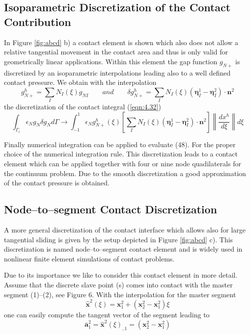 \subsection{Isoparametric Discretization of the Contact Contribution}
In Figure \ref{fig:abcd} b) a contact element is shown which also does not allow a relative tangential
movement in the contact area and thus is only valid for geometrically linear applications.
Within this element the gap function $g_{N+}$ is discretized by an isoparametric interpolations
leading also to a well deﬁned contact pressure. We obtain with the interpolation
\begin{equation}
     g_{N+}^{h}=\sum_{I} N_{I}(\xi) g_{N I} \qquad  \textit{and}  \qquad \delta g_{N+}^{h}=\sum_{I} N_{I}(\xi)\left(\boldsymbol{\eta}_{I}^{1}-\boldsymbol{\eta}_{I}^{2}\right) \cdot \mathbf{n}^{2} 
\end{equation}
the discretization of the contact integral (\ref{eqn:4.32})
\begin{equation}
 \int_{\Gamma_{c}} \epsilon_{N} g_{N} \delta g_{N} d \Gamma \longrightarrow \int_{-1}^{1} \epsilon_{N} g_{N+}^{h}(\xi)\left[\sum_{I} N_{I}(\xi)\left(\boldsymbol{\eta}_{I}^{1}-\boldsymbol{\eta}_{I}^{2}\right) \cdot \mathbf{n}^{2}\right]\left\|\frac{d x^{h}}{d \xi}\right\| d \xi 
 \label{eqn:4.48}
\end{equation}

Finally numerical integration can be applied to evaluate (48). For the proper choice of the
numerical integration rule. This discretization leads to a contact element which
can be applied together with four or nine node quadilaterals for the continuum problem.
Due to the smooth discretization a good approximation of the contact pressure is obtained.
\subsection{Node–to–segment Contact Discretization}
A more general discretization of the contact interface which allows also for large tangential
sliding is given by the setup depicted in Figure \ref{fig:abcd} c). This discretization is named node–to–segment contact element and is widely used in nonlinear ﬁnite element simulations of
contact problems.

Due to its importance we like to consider this contact element in more detail. Assume
that the discrete slave point (s) comes into contact with the master segment (1)–(2), see
Figure 6. With the interpolation for the master segment
\begin{equation}
 \hat{\mathbf{x}}^{2}(\xi)=\mathbf{x}_{1}^{2}+\left(\mathbf{x}_{2}^{2}-\mathbf{x}_{1}^{2}\right) \xi 
 \label{eqn:4.49}
\end{equation}
one can easily compute the tangent vector of the segment leading to
\begin{equation}
 \overline{\mathbf{a}}_{1}^{2}=\hat{\mathbf{x}}^{2}(\xi)_{, 1}=\left(\mathbf{x}_{2}^{2}-\mathbf{x}_{1}^{2}\right) 
 \label{eqn:4.50}
\end{equation}

